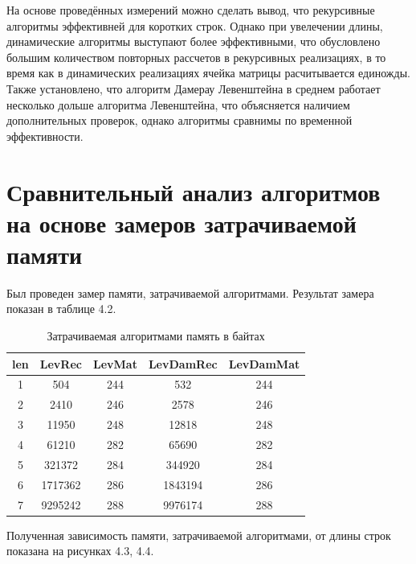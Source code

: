 \documentclass[12pt, a4paper]{report}
\begin{document}
\par
На основе проведённых измерений можно сделать вывод, что рекурсивные алгоритмы эффективней для коротких строк. Однако при увелечении длины, динамические алгоритмы выступают более эффективными, что обусловлено большим количеством повторных рассчетов в рекурсивных реализациях, в то время как в динамических реализациях ячейка матрицы расчитывается единожды. Также установлено, что алгоритм Дамерау Левенштейна в среднем работает несколько дольше алгоритма Левенштейна, что объясняется наличием дополнительных проверок, однако алгоритмы сравнимы по временной эффективности.



\section{Сравнительный анализ алгоритмов на основе замеров затрачиваемой памяти}
Был проведен замер памяти, затрачиваемой алгоритмами. Результат замера показан в таблице 4.2.


\begin{table} [H]
	\caption{Затрачиваемая алгоритмами память в байтах}
	\begin{center}
	\begin{tabular}{|c c c c c|} 
		\hline
		len & LevRec & LevMat & LevDamRec & LevDamMat \\ [0.8ex] 
		\hline
		1 & 504&244  &           532 &            244\\
		\hline
		2 & 2410     &     246      &      2578     &        246\\
		\hline
		3 & 11950      &    248       &    12818     &        248\\
		\hline
		4 & 61210        &  282         &  65690      &       282\\
		\hline
		5 & 321372       &   284         & 344920     &        284\\
		\hline
		6 & 1717362        &  286    &     1843194      &       286\\
		\hline
		7 & 9295242         & 288     &    9976174       &      288\\
		\hline
	\end{tabular}
	\end{center}
	
\end{table}



Полученная зависимость памяти, затрачиваемой алгоритмами, от длины строк показана на рисунках 4.3, 4.4.
\end{document}
